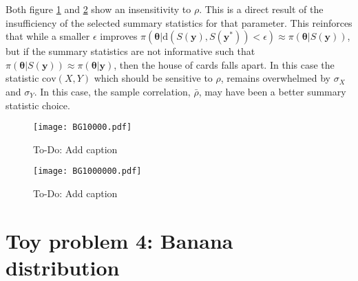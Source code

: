 Both figure \ref{KuVSKg-1} and \ref{KuVSKg-2} show an insensitivity to $\rho$. This is a direct result of the insufficiency of the selected summary statistics for that parameter. This reinforces that while a smaller $\epsilon$ improves $\pi(\bm{\theta}|\text{d}(S(\bm{y}),S(\bm{y^*}))<\epsilon) \approx \pi(\bm{\theta}|S(\bm{y}))$, but if the summary statistics are not informative such that $\pi(\bm{\theta}|S(\bm{y})) \approx \pi(\bm{\theta}|\bm{y})$, then the house of cards falls apart. In this case the statistic $\text{cov}(X,Y)$ which should be sensitive to $\rho$, remains overwhelmed by $\sigma_X$ and $\sigma_Y$. In this case, the sample correlation, $\bar{\rho}$, may have been a better summary statistic choice. 

\begin{figure}[H]
	\centering
	\texttt{[image: BG10000.pdf]}
	\caption{To-Do: Add caption}
	\label{KuVSKg-1}
\end{figure}

\begin{figure}[H]
	\centering
	\texttt{[image: BG1000000.pdf]}
	\caption{To-Do: Add caption}
	\label{KuVSKg-2}
\end{figure} 

\section{Toy problem 4: Banana distribution}

